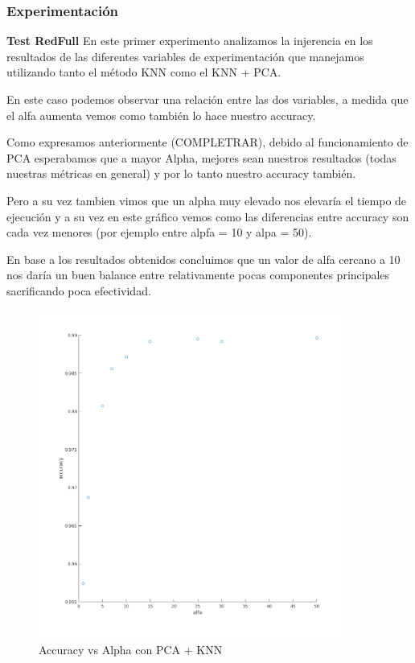 \subsubsection*{Experimentación}
\textbf{Test RedFull}
En este primer experimento analizamos la injerencia en los resultados de las diferentes variables de experimentación que manejamos utilizando tanto el método KNN como el KNN + PCA.


En este caso podemos observar una relación entre las dos variables, a medida que el alfa aumenta vemos como también lo hace nuestro accuracy.

Como expresamos anteriormente (COMPLETRAR), debido al funcionamiento de PCA esperabamos que a mayor Alpha, mejores sean nuestros resultados (todas nuestras métricas en general) y por lo tanto nuestro accuracy también.

Pero a su vez tambien vimos que un alpha muy elevado  nos elevaría el tiempo de ejecución y a su vez en este gráfico vemos como las diferencias entre accuracy son cada vez menores (por ejemplo entre alpfa = 10 y alpa = 50).

En base a los resultados obtenidos concluimos que un valor de alfa cercano a 10 nos daría un buen balance entre relativamente pocas componentes principales sacrificando poca efectividad.

\begin{figure}[H]
	\centering	\includegraphics[width=0.9\textwidth]{img/alfa_pca_accu.png}
	\caption{Accuracy vs Alpha con PCA + KNN}
	\label{fig:Accuracy vs Alpha con KNN + PCA}
\end{figure}

